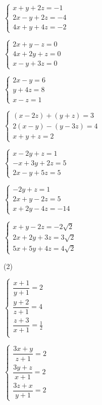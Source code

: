 \documentclass[12pt,a4paper]{article}
\begin{document}
\begin{exercise}
\begin{tasks}
\task $\begin{cases}
x + y + 2z = -1\\
2x - y + 2z = -4\\
4x + y + 4z = -2
\end{cases}$

\task $\begin{cases}
2x + y - z = 0\\
4x + 2y + z = 0\\
x - y + 3z = 0
\end{cases}$

\task $\begin{cases}
2x - y = 6\\
y + 4z = 8\\
x - z = 1
\end{cases}$

\task $\begin{cases}
(x-2z)+(y+z)=3\\
2(x-y)-(y-3z)=4\\
x+y+z=2
\end{cases}$

\task $\begin{cases}
x-2y+z=1\\
-x+3y+2z=5\\
2x-y+5z=5
\end{cases}$


\task $\begin{cases}
-2y+z=1\\
2x+y-2z=5\\
x+2y-4z=-14
\end{cases}$

\task $\begin{cases}
x+y-2z=-2\sqrt{2}\\
2x+2y+3z=3\sqrt{2}\\
5x+5y+4z=4\sqrt{2}
\end{cases}$

\end{tasks}
\end{exercise}


\begin{exercise}
\begin{tasks}(2)

\task $\begin{cases}
\dfrac{x+1}{y+1} = 2\\[6pt]
\dfrac{y+2}{z+1} = 4\\[6pt]
\dfrac{z+3}{x+1} = \frac{1}{2}\\[6pt]
\end{cases}$

\task $\begin{cases}
\dfrac{3x+y}{z+1} = 2\\[6pt]
\dfrac{3y+z}{x+1} = 2\\[6pt]
\dfrac{3z+x}{y+1} = 2
\end{cases}$

\end{tasks}
\end{exercise}
\end{document}
